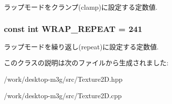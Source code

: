 ラップモードをクランプ(clamp)に設定する定数値. \hypertarget{classm3g_1_1Texture2D_b37ff061b9fb272284c4c389deec9266}{
\subsubsection[{WRAP\_\-REPEAT}]{\setlength{\rightskip}{0pt plus 5cm}const int {\bf WRAP\_\-REPEAT} = 241}}
\label{classm3g_1_1Texture2D_b37ff061b9fb272284c4c389deec9266}


ラップモードを繰り返し(repeat)に設定する定数値. 

このクラスの説明は次のファイルから生成されました:\begin{CompactItemize}
\item 
/work/desktop-m3g/src/Texture2D.hpp\item 
/work/desktop-m3g/src/Texture2D.cpp\end{CompactItemize}
